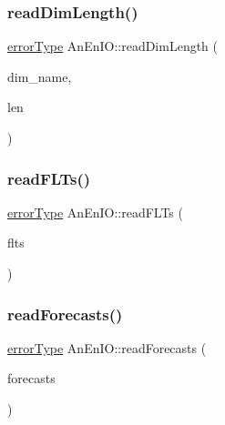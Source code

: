 \subsubsection{\texorpdfstring{read\+Dim\+Length()}{readDimLength()}}
{\footnotesize\ttfamily \mbox{\hyperlink{class_an_en_i_o_aa56bc1ec6610b86db4349bce20f9ead0}{error\+Type}} An\+En\+I\+O\+::read\+Dim\+Length (\begin{DoxyParamCaption}\item[{std\+::string}]{dim\+\_\+name,  }\item[{std\+::size\+\_\+t \&}]{len }\end{DoxyParamCaption})}

\mbox{\label{class_an_en_i_o_aa58735032dd6f54c83d6450842922d3f}} 
\subsubsection{\texorpdfstring{read\+F\+L\+Ts()}{readFLTs()}}
{\footnotesize\ttfamily \mbox{\hyperlink{class_an_en_i_o_aa56bc1ec6610b86db4349bce20f9ead0}{error\+Type}} An\+En\+I\+O\+::read\+F\+L\+Ts (\begin{DoxyParamCaption}\item[{\mbox{\hyperlink{classanen_time_1_1_f_l_ts}{anen\+Time\+::\+F\+L\+Ts}} \&}]{flts }\end{DoxyParamCaption})}

\mbox{\label{class_an_en_i_o_a912e513e58fa258e1dce67ff161abab2}} 
\subsubsection{\texorpdfstring{read\+Forecasts()}{readForecasts()}}
{\footnotesize\ttfamily \mbox{\hyperlink{class_an_en_i_o_aa56bc1ec6610b86db4349bce20f9ead0}{error\+Type}} An\+En\+I\+O\+::read\+Forecasts (\begin{DoxyParamCaption}\item[{\mbox{\hyperlink{class_forecasts}{Forecasts}} \&}]{forecasts }\end{DoxyParamCaption})}

\mbox{\label{class_an_en_i_o_a41ebcc0c9edee123626bf6e606917a49}} 
